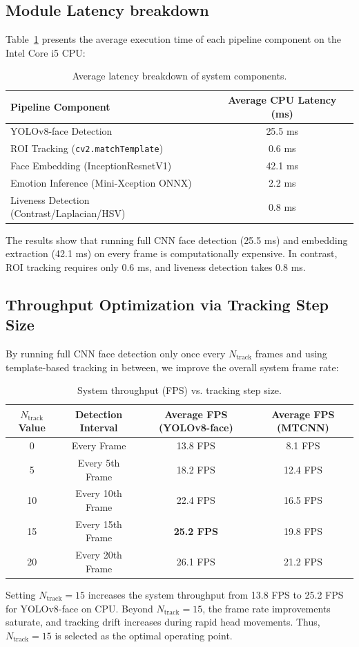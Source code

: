 \subsection{Module Latency breakdown}
Table~\ref{tab:latency-breakdown} presents the average execution time of each pipeline component on the Intel Core i5 CPU:
\begin{table}[H]
\centering
\caption{Average latency breakdown of system components.}
\label{tab:latency-breakdown}
\begin{tabular}{lc}
\toprule
\textbf{Pipeline Component} & \textbf{Average CPU Latency (ms)} \\
\midrule
YOLOv8-face Detection & 25.5 ms \\
ROI Tracking (\texttt{cv2.matchTemplate}) & 0.6 ms \\
Face Embedding (InceptionResnetV1) & 42.1 ms \\
Emotion Inference (Mini-Xception ONNX) & 2.2 ms \\
Liveness Detection (Contrast/Laplacian/HSV) & 0.8 ms \\
\bottomrule
\end{tabular}
\end{table}
The results show that running full CNN face detection (25.5 ms) and embedding extraction (42.1 ms) on every frame is computationally expensive. In contrast, ROI tracking requires only 0.6 ms, and liveness detection takes 0.8 ms.

\subsection{Throughput Optimization via Tracking Step Size}
By running full CNN face detection only once every $N_{\text{track}}$ frames and using template-based tracking in between, we improve the overall system frame rate:
\begin{table}[H]
\centering
\caption{System throughput (FPS) vs. tracking step size.}
\label{tab:fps-optimization}
\begin{tabular}{cccc}
\toprule
\textbf{$N_{\text{track}}$ Value} & \textbf{Detection Interval} & \textbf{Average FPS (YOLOv8-face)} & \textbf{Average FPS (MTCNN)} \\
\midrule
0 & Every Frame & 13.8 FPS & 8.1 FPS \\
5 & Every 5th Frame & 18.2 FPS & 12.4 FPS \\
10 & Every 10th Frame & 22.4 FPS & 16.5 FPS \\
15 & Every 15th Frame & \textbf{25.2 FPS} & 19.8 FPS \\
20 & Every 20th Frame & 26.1 FPS & 21.2 FPS \\
\bottomrule
\end{tabular}
\end{table}
Setting $N_{\text{track}} = 15$ increases the system throughput from 13.8 FPS to 25.2 FPS for YOLOv8-face on CPU. Beyond $N_{\text{track}} = 15$, the frame rate improvements saturate, and tracking drift increases during rapid head movements. Thus, $N_{\text{track}} = 15$ is selected as the optimal operating point.

